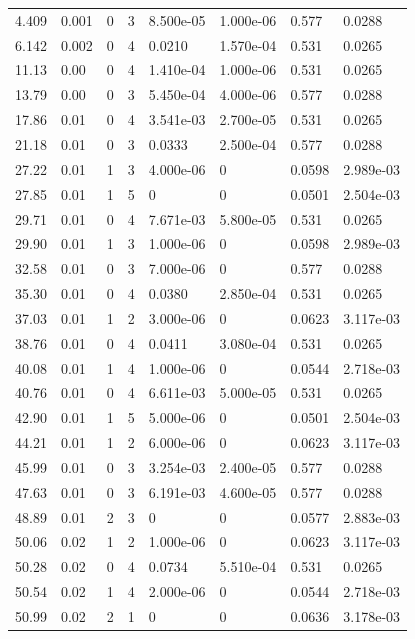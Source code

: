\documentclass[preview]{standalone}
\begin{document}
{{\begin{tabular}{L{1.2cm}C{1.2cm} C{0.3cm}C{0.5cm} C{1.4cm}C{1.4cm} C{1.4cm}C{1.4cm}}
  4.409  &  0.001  & 0     &  3 &  8.500e-05  & 1.000e-06  & 0.577 &  0.0288   \\ 
  6.142  &  0.002  & 0     &  4 &  0.0210  & 1.570e-04  & 0.531 &  0.0265   \\ 
  11.13  &  0.00  & 0     &  4 &  1.410e-04  & 1.000e-06  & 0.531 &  0.0265   \\ 
  13.79  &  0.00  & 0     &  3 &  5.450e-04  & 4.000e-06  & 0.577 &  0.0288   \\ 
  17.86  &  0.01  & 0     &  4 &  3.541e-03  & 2.700e-05  & 0.531 &  0.0265   \\ 
  21.18  &  0.01  & 0     &  3 &  0.0333  & 2.500e-04  & 0.577 &  0.0288   \\ 
  27.22  &  0.01  & 1     &  3 &  4.000e-06  & 0  & 0.0598 &  2.989e-03   \\ 
  27.85  &  0.01  & 1     &  5 &  0  & 0  & 0.0501 &  2.504e-03   \\ 
  29.71  &  0.01  & 0     &  4 &  7.671e-03  & 5.800e-05  & 0.531 &  0.0265   \\ 
  29.90  &  0.01  & 1     &  3 &  1.000e-06  & 0  & 0.0598 &  2.989e-03   \\ 
  32.58  &  0.01  & 0     &  3 &  7.000e-06  & 0  & 0.577 &  0.0288   \\ 
  35.30  &  0.01  & 0     &  4 &  0.0380  & 2.850e-04  & 0.531 &  0.0265   \\ 
  37.03  &  0.01  & 1     &  2 &  3.000e-06  & 0  & 0.0623 &  3.117e-03   \\ 
  38.76  &  0.01  & 0     &  4 &  0.0411  & 3.080e-04  & 0.531 &  0.0265   \\ 
  40.08  &  0.01  & 1     &  4 &  1.000e-06  & 0  & 0.0544 &  2.718e-03   \\ 
  40.76  &  0.01  & 0     &  4 &  6.611e-03  & 5.000e-05  & 0.531 &  0.0265   \\ 
  42.90  &  0.01  & 1     &  5 &  5.000e-06  & 0  & 0.0501 &  2.504e-03   \\ 
  44.21  &  0.01  & 1     &  2 &  6.000e-06  & 0  & 0.0623 &  3.117e-03   \\ 
  45.99  &  0.01  & 0     &  3 &  3.254e-03  & 2.400e-05  & 0.577 &  0.0288   \\ 
  47.63  &  0.01  & 0     &  3 &  6.191e-03  & 4.600e-05  & 0.577 &  0.0288   \\ 
  48.89  &  0.01  & 2     &  3 &  0  & 0  & 0.0577 &  2.883e-03   \\ 
  50.06  &  0.02  & 1     &  2 &  1.000e-06  & 0  & 0.0623 &  3.117e-03   \\ 
  50.28  &  0.02  & 0     &  4 &  0.0734  & 5.510e-04  & 0.531 &  0.0265   \\ 
  50.54  &  0.02  & 1     &  4 &  2.000e-06  & 0  & 0.0544 &  2.718e-03   \\ 
  50.99  &  0.02  & 2     &  1 &  0  & 0  & 0.0636 &  3.178e-03   \\ 
\hline 
\end{tabular} 

}}
\end{document}
